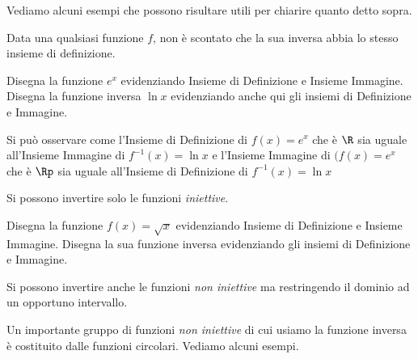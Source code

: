 Vediamo alcuni esempi che possono risultare utili per chiarire quanto 
detto sopra.

Data una qualsiasi funzione \(f\), non è scontato che la sua inversa 
abbia lo stesso insieme di definizione. 

\begin{esempio}
Disegna la funzione \(e^x\) evidenziando Insieme di Definizione e Insieme 
Immagine. Disegna la funzione inversa \(\ln x\) evidenziando anche qui gli 
insiemi di Definizione e Immagine.

Si può osservare come l'Insieme di Definizione di \(f(x) = e^x\) che è 
\(\R\) sia uguale 
all'Insieme Immagine di \(f^{-1}(x) = \ln x\) e l'Insieme Immagine di 
\((f(x) = e^x\) che è \(\Rp\)
sia uguale all'Insieme di Definizione di \(f^{-1}(x) = \ln x\) 
\end{esempio}

Si possono invertire solo le funzioni \emph{iniettive}.

\begin{esempio}
Disegna la funzione \(f(x) = \sqrt{x}\) evidenziando 
Insieme di Definizione e Insieme Immagine. 
Disegna la sua funzione inversa evidenziando gli insiemi 
di Definizione e Immagine.

\end{esempio}

Si possono invertire anche le funzioni \emph{non iniettive} ma restringendo il 
dominio ad un opportuno intervallo.

Un importante gruppo di funzioni \emph{non iniettive} di cui usiamo 
la funzione inversa è costituito dalle funzioni circolari.
Vediamo alcuni esempi.

\pagebreak %

